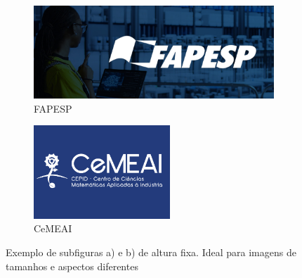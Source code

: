 \begin{figure}[H]
    \centering
    \begin{subfigure}{0.45\linewidth}
        \centering
        \includegraphics[height=3.5cm]{Figuras/FAPESP.jpg}
        \caption{FAPESP \cite{fapesp}}
    \end{subfigure}
    \hfill
    \begin{subfigure}{0.45\linewidth}
        \centering
        \includegraphics[height=3.5cm]{Figuras/CEMEAI.png}
        \caption{CeMEAI \cite{cemeai}}
    \end{subfigure}
    \caption{Exemplo de subfiguras a) e b) de altura fixa. Ideal para imagens de tamanhos e aspectos diferentes}
    \label{fig:alturafixa2}
\end{figure}

